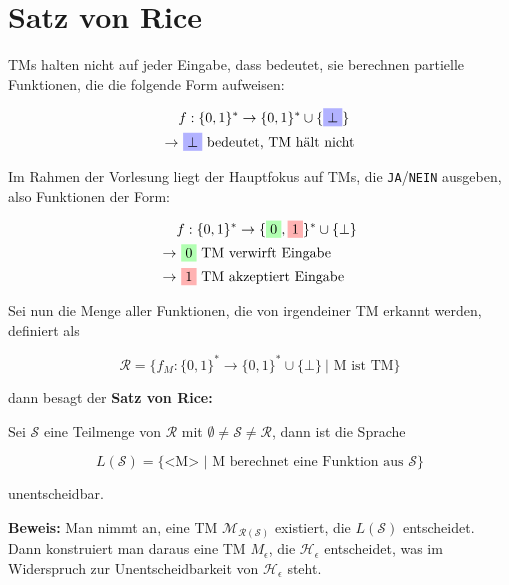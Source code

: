 \documentclass{scrartcl}%
\begin{document}

    \section*{Satz von Rice}
    TMs halten nicht auf jeder Eingabe, dass bedeutet, sie berechnen partielle Funktionen, die die folgende Form aufweisen:

    \begin{align*}
        & f : \{0,1\}^* \rightarrow \{0,1\}^* \cup \{\colorbox{blue!30}{$\bot$} \} \\
        \rightarrow &\ \colorbox{blue!30}{$\bot$} \text{ bedeutet, TM hält nicht}
    \end{align*}

    Im Rahmen der Vorlesung liegt der Hauptfokus auf TMs, die \texttt{JA}/\texttt{NEIN} ausgeben, also Funktionen der Form:

    \begin{align*}
        & f : \{0,1\}^* \rightarrow \{\colorbox{green!30}{$0$},\colorbox{red!30}{$1$}\}^* \cup \{\bot \} \\
        \rightarrow &\ \colorbox{green!30}{$0$} \text{ TM verwirft Eingabe} \\
        \rightarrow &\ \colorbox{red!30}{$1$} \text{ TM akzeptiert Eingabe}
    \end{align*}

    Sei nun die Menge aller Funktionen, die von irgendeiner TM erkannt werden, definiert als

    \begin{equation*}
        \mathcal{R} = \{f_M : \{0,1\}^* \rightarrow \{0,1\}^* \cup \{\bot\}\ |\text{ M ist TM} \}
    \end{equation*}

    dann besagt der
    \textbf{\textsf{Satz von Rice:}}

    \vspace*{0.3cm}
    Sei $\mathcal{S}$ eine Teilmenge von $\mathcal{R}$ mit $ \emptyset \neq \mathcal{S} \neq \mathcal{R}$, dann ist die Sprache

    \begin{equation*}
        L(\mathcal{S}) = \{ \text{<M> } | \text{ M berechnet eine Funktion aus } \mathcal{S} \}
    \end{equation*}

    unentscheidbar.\proofend

    \vspace*{0.3cm}
    \textbf{\textsf{Beweis:}} Man nimmt an, eine TM $\mathcal{M}_{\mathcal{R}(\mathcal{S})}$ existiert,
    die $L(\mathcal{S})$ entscheidet.
    Dann konstruiert man daraus eine TM $M_{\epsilon}$, die $\mathcal{H}_\epsilon$ entscheidet,
    was im Widerspruch zur Unentscheidbarkeit von $\mathcal{H}_\epsilon$ steht.
\end{document}
